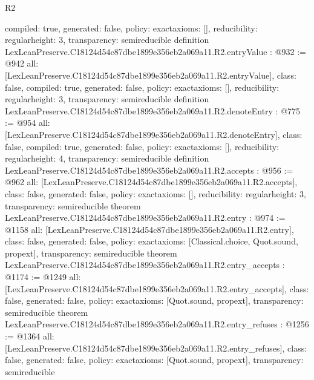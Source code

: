 \begin{lexlean}{R2}
\begin{coremodule}
{  compiled: true,
  generated: false,
  policy: exact{axioms: []},
  reducibility: regular{height: 3},
  transparency: semireducible
}
definition LexLeanPreserve.C18124d54c87dbe1899e356eb2a069a11.R2.entryValue : @932 := @942 {
  all: [LexLeanPreserve.C18124d54c87dbe1899e356eb2a069a11.R2.entryValue],
  class: false,
  compiled: true,
  generated: false,
  policy: exact{axioms: []},
  reducibility: regular{height: 3},
  transparency: semireducible
}
definition LexLeanPreserve.C18124d54c87dbe1899e356eb2a069a11.R2.denoteEntry : @775 := @954 {
  all: [LexLeanPreserve.C18124d54c87dbe1899e356eb2a069a11.R2.denoteEntry],
  class: false,
  compiled: true,
  generated: false,
  policy: exact{axioms: []},
  reducibility: regular{height: 4},
  transparency: semireducible
}
definition LexLeanPreserve.C18124d54c87dbe1899e356eb2a069a11.R2.accepts : @956 := @962 {
  all: [LexLeanPreserve.C18124d54c87dbe1899e356eb2a069a11.R2.accepts],
  class: false,
  generated: false,
  policy: exact{axioms: []},
  reducibility: regular{height: 3},
  transparency: semireducible
}
theorem LexLeanPreserve.C18124d54c87dbe1899e356eb2a069a11.R2.entry : @974 := @1158 {
  all: [LexLeanPreserve.C18124d54c87dbe1899e356eb2a069a11.R2.entry],
  class: false,
  generated: false,
  policy: exact{axioms: [Classical.choice, Quot.sound, propext]},
  transparency: semireducible
}
theorem LexLeanPreserve.C18124d54c87dbe1899e356eb2a069a11.R2.entry_accepts : @1174 := @1249 {
  all: [LexLeanPreserve.C18124d54c87dbe1899e356eb2a069a11.R2.entry_accepts],
  class: false,
  generated: false,
  policy: exact{axioms: [Quot.sound, propext]},
  transparency: semireducible
}
theorem LexLeanPreserve.C18124d54c87dbe1899e356eb2a069a11.R2.entry_refuses : @1256 := @1364 {
  all: [LexLeanPreserve.C18124d54c87dbe1899e356eb2a069a11.R2.entry_refuses],
  class: false,
  generated: false,
  policy: exact{axioms: [Quot.sound, propext]},
  transparency: semireducible
}


\end{coremodule}
\end{lexlean}

